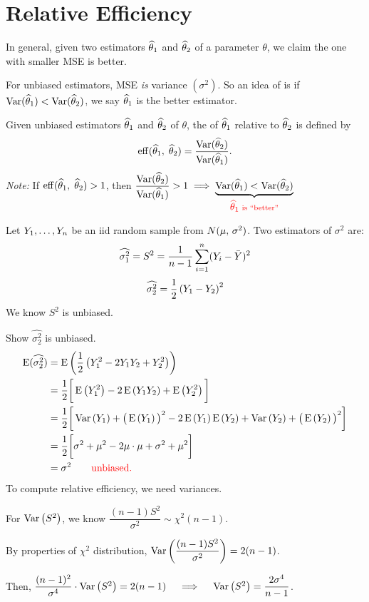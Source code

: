 \section{Relative Efficiency}
In general, given two estimators $\widehat{\theta}_1$ and $\widehat{\theta}_2$ of a parameter $\theta$, we claim the one with smaller MSE is better.

\nl For unbiased estimators, MSE \textit{is} variance $(\sigma^2)$. So an idea of  is if $\Var*{\that_1} < \Var*{\that_2}$, we say $\widehat{\theta}_1$ is the better estimator.

 Given unbiased estimators $\widehat{\theta}_1$ and $\widehat{\theta}_2$ of $\theta$, the of $\widehat{\theta}_1$ relative to $\widehat{\theta}_2$ is defined by
$$\eff*{\that_1,\; \that_2} = \dfrac{\Var*{\that_2} }{\Var*{\that_1} }.$$
\textit{Note: } If $\eff*{\that_1,\; \that_2} > 1$, then $\dfrac{\Var*{\that_2} }{\Var*{\that_1} } > 1 \implies \underbrace{\Var*{\that_1}  < \Var*{\that_2} }_{\textstyle \red{\that_1 \scriptstyle \text{ is \say{better}}}}$

\example Let ${Y}_1, \dots, {Y}_n$ be an iid random sample from $\normalDist*$. Two estimators of $\sigma^2$ are:
$$\widehat{\sigma^2_1} = S^2 = \dfrac{1}{n-1} \sum_{i=1}^n (Y_i -\bar{Y})^2$$
$$\widehat{\sigma^2_2} = \over{2} \pars{Y_1 - Y_2}^2$$
We know $S^2$ is unbiased.

\newpage Show $\widehat{\sigma^2_2}$ is unbiased.
\begin{align*}
    \E*{\widehat{\sigma^2_2}} &= \E{\over{2}\pars{Y_1^2 - 2Y_1Y_2 + Y_2^2} }\\
    &= \over{2}\bigg[ \E{Y_1^2} -2\E{Y_1Y_2} + \E{Y_2^2} \bigg]\\
    &= \over{2}\bigg[ \Var{Y_1} + \big(\E{Y_1}\big)^2 -2\E{Y_1}\E{Y_2} + \Var{Y_2} +  \big(\E{Y_2}\big)^2 \bigg]\\
    &= \over{2}\bigg[ \sigma^2 + \mu^2 - 2\mu\cdot \mu + \sigma^2 + \mu^2 \bigg]\\
    &= \sigma^2 \qquad \text{\red{unbiased.}}
\end{align*}
To compute relative efficiency, we need variances.

\nl For $\Var{S^2}$, we know $\dfrac{(n-1)S^2}{\sigma^2} \sim \chi^2 (n-1)$.

\nl By properties of $\chi^2$ distribution, $\Var{\dfrac{(n-1)S^2}{\sigma^2}} = 2(n-1)$.

\nl Then, $\dfrac{(n-1)^2}{\sigma^4}\cdot \Var{S^2} = 2(n-1) \quad \implies \quad \Var{S^2} = \dfrac{2\sigma^4}{n-1}$.

